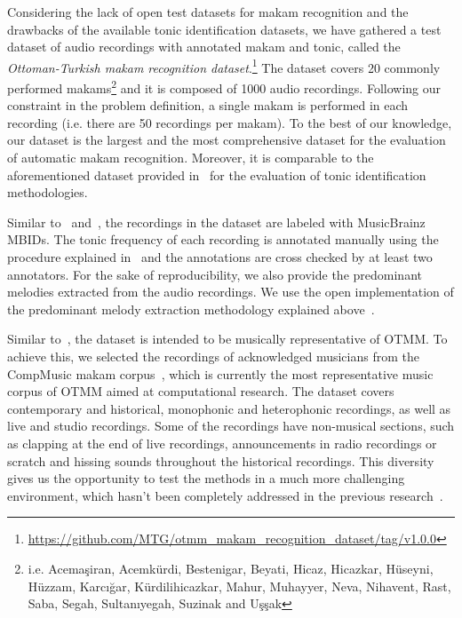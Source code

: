 \documentclass{sig-alternate}
\begin{document}
Considering the lack of open test datasets for makam re\-cognition and the drawbacks of the available tonic identification datasets, we have gathered a test dataset of audio recordings with annotated makam and tonic, called the \emph{Ottoman-Turkish makam recognition dataset}.\footnote{\url{https://github.com/MTG/otmm_makam_recognition_dataset/tag/v1.0.0}} The data\-set covers 20 commonly performed makams\footnote{i.e. Acema\c{s}iran, Acemk\"{u}rdi, Bestenigar, Beyati, Hicaz, Hicazkar, H\"{u}seyni, H\"{u}zzam, Karc{\i}\u{g}ar, K\"{u}rdilihicazkar, Mahur, Muhayyer, Neva, Nihavent, Rast, Saba, Segah, Sultan{\i}yegah, Suzinak and U\c{s}\c{s}ak} and it is composed of 1000 audio recordings. Following our constraint in the problem definition, a single makam is performed in each recording (i.e. there are 50 recordings per makam). To the best of our knowledge, our dataset is the largest and the most comprehensive dataset for the evaluation of automatic makam re\-cognition. Moreover, it is comparable to the aforementioned dataset provided in~\cite{atli2014makamFeature_atmm} for the evaluation of tonic identification methodologies.

Similar to~\cite{sercan_tonic} and~\cite{senturk2013karar_ismir}, the recordings in the dataset are labeled with MusicBrainz MBIDs. The tonic frequency of each recording is annotated manually using the procedure explained in~\cite{senturk2013karar_ismir} and the annotations are cross checked by at least two annotators. For the sake of reproducibility, we also provide the predominant melodies extracted from the audio recordings. We use the open implementation of the predominant melody extraction methodology explained above~\cite{atli2014makamFeature_atmm}.

Similar to~\cite{bozkurt_makam}, the dataset is intended to be musically representative of OTMM. To achieve this, we selected the recordings of acknowledged musicians from the CompMusic makam corpus~\cite{compmusic_corpus}, which is currently the most representative music corpus of OTMM aimed at computational research. The dataset covers contemporary and historical, monophonic and heterophonic recordings, as well as live and studio recordings. Some of the recordings have non-musical sections, such as clapping at the end of live recordings, announcements in radio recordings or scratch and hissing sounds throughout the historical recordings. %
This diversity gives us the opportunity to test the methods in a much more challenging environment, which hasn't been completely addressed in the previous research~\cite{bozkurt_makam}.
\end{document}
